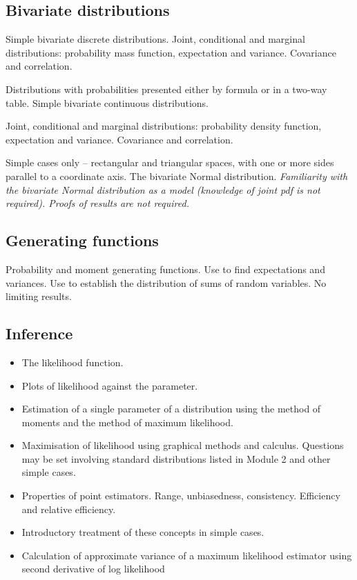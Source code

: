 
\subsection*{Bivariate distributions}

Simple bivariate discrete distributions. 
Joint, conditional and marginal distributions: probability mass function, expectation and variance. 
Covariance and correlation.

Distributions with probabilities presented either by formula or in a two-way table.
Simple bivariate continuous distributions. 


Joint, conditional and marginal distributions: probability density function, expectation and variance. 
Covariance and correlation.

Simple cases only – rectangular and triangular spaces, with one or more sides parallel to a coordinate axis.
The bivariate Normal distribution.
\textit{Familiarity with the bivariate Normal distribution as a model (knowledge of joint pdf is not required). 
Proofs of results are not required.}
\subsection*{Generating functions}
Probability and moment generating functions.
Use to find expectations and variances. 
Use to establish the distribution of sums of random variables.
No limiting results.
\subsection*{Inference}
\begin{itemize}
\item	The likelihood function.
\item	Plots of likelihood against the parameter.
\item	Estimation of a single parameter of a distribution using the method of moments and the method of maximum likelihood.
\item	Maximisation of likelihood using graphical methods and calculus. Questions may be set involving standard distributions listed in Module 2 and other simple cases.
\item	Properties of point estimators. Range, unbiasedness, consistency. Efficiency and relative efficiency.
\item	Introductory treatment of these concepts in simple cases.
\item	Calculation of approximate variance of a maximum likelihood estimator using second derivative of log likelihood
\end{itemize}
